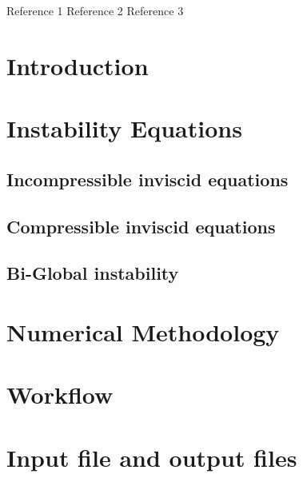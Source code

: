 \documentclass[preprint,12pt]{elsarticle}
\begin{document}
\begin{small}
\begin{thebibliography}{0}
Reference 1         %
Reference 2         %
Reference 3         %
\end{thebibliography}
\end{small}


\section{Introduction}
\label{introduction}

\section{Instability Equations}
\label{instability equations}
\subsection{Incompressible inviscid equations}
\subsection{Compressible inviscid equations}
\subsection{Bi-Global instability}
\section{Numerical Methodology}\label{numerical method}

\section{Workflow}
\label{workflow}

\section{Input file and output files}
\label{input and output}
\end{document}

